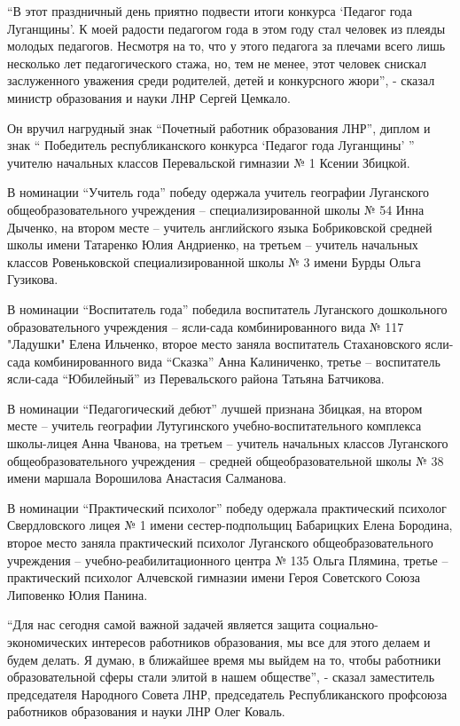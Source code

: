\enquote{В этот праздничный день приятно подвести итоги конкурса 
\enquote{Педагог года Луганщины}. К моей радости педагогом года в этом году стал человек из плеяды
молодых педагогов. Несмотря на то, что у этого педагога за плечами всего лишь
несколько лет педагогического стажа, но, тем не менее, этот человек снискал
заслуженного уважения среди родителей, детей и конкурсного жюри}, - сказал
министр образования и науки ЛНР Сергей Цемкало.

Он вручил нагрудный знак \enquote{Почетный работник образования ЛНР}, диплом и знак
\enquote{ Победитель республиканского конкурса \enquote{Педагог года Луганщины} } учителю
начальных классов Перевальской гимназии № 1 Ксении Збицкой.

В номинации \enquote{Учитель года} победу одержала учитель географии Луганского
общеобразовательного учреждения – специализированной школы № 54 Инна Дыченко,
на втором месте – учитель английского языка Бобриковской средней школы имени
Татаренко Юлия Андриенко, на третьем – учитель начальных классов Ровеньковской
специализированной школы № 3 имени Бурды Ольга Гузикова.

В номинации \enquote{Воспитатель года} победила воспитатель Луганского дошкольного
образовательного учреждения – ясли-сада комбинированного вида № 117 "Ладушки"
Елена Ильченко, второе место заняла воспитатель Стахановского ясли-сада
комбинированного вида \enquote{Сказка} Анна Калиниченко, третье – воспитатель ясли-сада
\enquote{Юбилейный} из Перевальского района Татьяна Батчикова.

В номинации \enquote{Педагогический дебют} лучшей признана Збицкая, на втором месте –
учитель географии Лутугинского учебно-воспитательного комплекса школы-лицея
Анна Чванова, на третьем – учитель начальных классов Луганского
общеобразовательного учреждения – средней общеобразовательной школы № 38 имени
маршала Ворошилова Анастасия Салманова.

В номинации \enquote{Практический психолог} победу одержала практический психолог
Свердловского лицея № 1 имени сестер-подпольщиц Бабарицких Елена Бородина,
второе место заняла практический психолог Луганского общеобразовательного
учреждения – учебно-реабилитационного центра № 135 Ольга Плямина, третье –
практический психолог Алчевской гимназии имени Героя Советского Союза Липовенко
Юлия Панина.

\enquote{Для нас сегодня самой важной задачей является защита социально-экономических
интересов работников образования, мы все для этого делаем и будем делать. Я
думаю, в ближайшее время мы выйдем на то, чтобы работники образовательной сферы
стали элитой в нашем обществе}, - сказал заместитель председателя Народного
Совета ЛНР, председатель Республиканского профсоюза работников образования и
науки ЛНР Олег Коваль.

